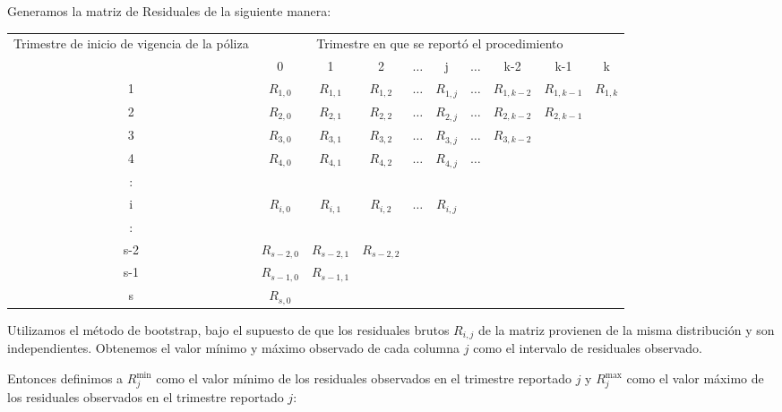 \documentclass[11pt,twoside,openright,spanish]{report}
\numberwithin{equation}{chapter}
\numberwithin{figure}{chapter}
\numberwithin{table}{chapter}
\begin{document}
	Generamos la matriz de Residuales de la siguiente manera:

	\begin{table}[ht]
		\centering
		\begin{tabularx}{\linewidth}{ c|ccccccccc}
			\multirow{2}{4cm}{Trimestre de inicio de vigencia de la póliza}
			& \multicolumn{9}{c}{Trimestre en que se reportó el procedimiento} \\
			& 0  & 1 & 2 & $ \dots $ & j & $\dots $ & k-2 & k-1 &  k \\
			\midrule
			1      &  $R_{1,0}^{ }$ & $R_{1,1}^{ }$ & $R_{1,2}^{ }$ & $ \dots $ & $R_{1,j}^{ }$ & $ \dots $ & $R_{1,k-2}^{ }$ & $R_{1,k-1}^{ }$ & $R_{1,k}^{ }$ \\
			2      &  $R_{2,0}^{ }$ & $R_{2,1}^{ }$ & $R_{2,2}^{ }$ & $ \dots $ & $R_{2,j}^{ }$ & $ \dots $ & $R_{2,k-2}^{ }$ & $R_{2,k-1}^{ }$ & \\
			3      &  $R_{3,0}^{ }$ & $R_{3,1}^{ }$ & $R_{3,2}^{ }$ & $ \dots $ & $R_{3,j}^{ }$ & $ \dots $ & $R_{3,k-2}^{ }$ & & \\
			4      &  $R_{4,0}^{ }$ & $R_{4,1}^{ }$ & $R_{4,2}^{ }$ & $ \dots $ & $R_{4,j}^{ }$ & $ \dots $ & & & \\
			:      & & & & & & & & & \\
			i      &  $R_{i,0}^{ }$ & $R_{i,1}^{ }$ & $R_{i,2}^{ }$ & $ \dots $ & $R_{i,j}^{ }$ & & & & \\
			:      & & & & & & & & & \\
			s-2      &  $R_{s-2,0}^{ }$ & $R_{s-2,1}^{ }$ & $R_{s-2,2}^{ }$ & & & & & & \\
			s-1      &  $R_{s-1,0}^{ }$ & $R_{s-1,1}^{ }$ & & & & & & & \\
			s      &  $R_{s,0}^{ }$ & & & & & & & & \\
		\end{tabularx}
	\end{table}
 
	Utilizamos el método de bootstrap, bajo el supuesto de que los residuales brutos $R_{i,j}$ de la matriz provienen de la misma distribución y son independientes. Obtenemos el valor mínimo y máximo observado de cada columna $j$ como el intervalo de residuales observado.
	 
	Entonces definimos a $R_{j}^{\text{min}}$ como el valor mínimo de los residuales observados en el trimestre reportado $j$ y $R_{j}^{\text{max}}$ como el valor máximo de los residuales observados en el trimestre reportado $j$:
	
\end{document}

